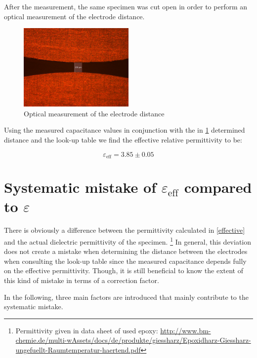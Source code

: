 After the measurement, the same specimen was cut open in order to perform an optical measurement of the electrode distance.


\begin{figure}[ht]
	\centering
	\includegraphics[width=0.5\textwidth]{figures/Results/Capacitance_Measure/Sample1_scale.jpg}		
	\caption[Kurze Abbildungsbeschreibung]{Optical measurement of the electrode distance \protect\footnotemark} 
	\label{fig.opticalmeasurement}
\end{figure}
Using the measured capacitance values in conjunction with the in \ref{fig.opticalmeasurement} determined distance and the look-up table
we find the effective relative permittivity to be:

\begin{equation}
 \varepsilon_{\textrm{eff}}=3.85 \pm 0.05
\end{equation}



\section{Systematic mistake of $\varepsilon_{\textrm{eff}}$ compared to $\varepsilon$}
There is obviously a difference between the permittivity calculated in \ref{effective}
and the actual dielectric permittivity of the specimen. \footnote{Permittivity given in data sheet of used epoxy: \url{http://www.bm-chemie.de/multi-wAssets/docs/de/produkte/giessharz/Epoxidharz-Giessharz-ungefuellt-Raumtemperatur-haertend.pdf}}
In general, this deviation does not create a mistake when determining the
distance between the electrodes when consulting the look-up table since the
measured capacitance depends fully on the effective permittivity. Though, it is still
beneficial to know the extent of this kind of mistake in terms of a correction factor.

In the following, three main factors are introduced that mainly contribute to the systematic mistake.

